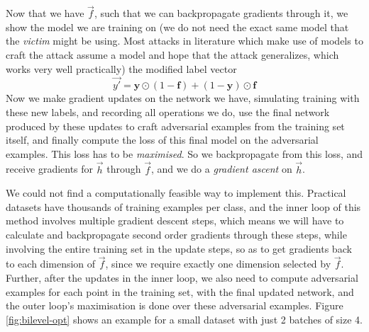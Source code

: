 \documentclass{ociamthesis}
\begin{document}
Now that we have $\vec{f}$, such that we can backpropagate gradients through it,
we show the model we are training on (we do not need the exact same model that
the \emph{victim} might be using. Most attacks in literature which make use of
models to craft the attack assume a model and hope that the attack generalizes,
which works very well practically) the modified label vector
\begin{equation*}
    \vec{y'} = \textbf{y}\odot(1-\textbf{f})+(1-\textbf{y})\odot\textbf{f}
\end{equation*}
Now we make gradient updates on the network we have, simulating training with
these new labels, and recording all operations we do, use the final network
produced by these updates to craft adversarial examples from the training set
itself, and finally compute the loss of this final model on the adversarial
examples. This loss has to be \emph{maximised}. So we backpropagate from this
loss, and receive gradients for $\vec{h}$ through $\vec{f}$, and we do a
\emph{gradient ascent} on $\vec{h}$.

We could not find a computationally feasible way to implement this. Practical
datasets have thousands of training examples per class, and the inner loop of
this method involves multiple gradient descent steps, which means we will have
to calculate and backpropagate second order gradients through these steps, while
involving the entire training set in the update steps, so as to get gradients
back to each dimension of $\vec{f}$, since we require exactly one dimension
selected by $\vec{f}$. Further, after the updates in the inner loop, we also
need to compute adversarial examples for each point in the training set, with
the final updated network, and the outer loop's maximisation is done over these
adversarial examples. Figure \ref{fig:bilevel-opt} shows an example for a small
dataset with just 2 batches of size 4.
\end{document}
